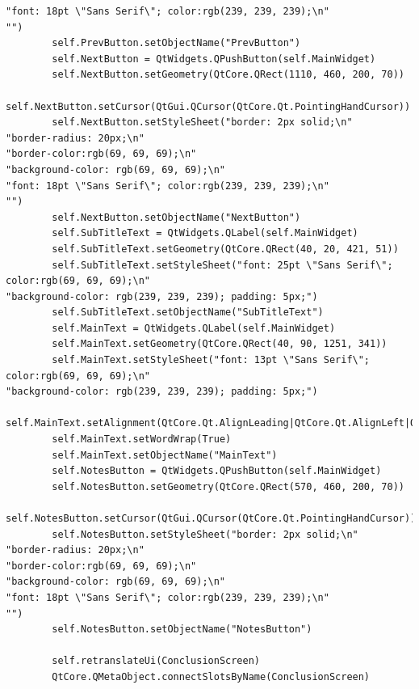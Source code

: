 \documentclass[12pt]{article}
\begin{document}
\begin{lstlisting}
"font: 18pt \"Sans Serif\"; color:rgb(239, 239, 239);\n"
"")
        self.PrevButton.setObjectName("PrevButton")
        self.NextButton = QtWidgets.QPushButton(self.MainWidget)
        self.NextButton.setGeometry(QtCore.QRect(1110, 460, 200, 70))
        self.NextButton.setCursor(QtGui.QCursor(QtCore.Qt.PointingHandCursor))
        self.NextButton.setStyleSheet("border: 2px solid;\n"
"border-radius: 20px;\n"
"border-color:rgb(69, 69, 69);\n"
"background-color: rgb(69, 69, 69);\n"
"font: 18pt \"Sans Serif\"; color:rgb(239, 239, 239);\n"
"")
        self.NextButton.setObjectName("NextButton")
        self.SubTitleText = QtWidgets.QLabel(self.MainWidget)
        self.SubTitleText.setGeometry(QtCore.QRect(40, 20, 421, 51))
        self.SubTitleText.setStyleSheet("font: 25pt \"Sans Serif\"; color:rgb(69, 69, 69);\n"
"background-color: rgb(239, 239, 239); padding: 5px;")
        self.SubTitleText.setObjectName("SubTitleText")
        self.MainText = QtWidgets.QLabel(self.MainWidget)
        self.MainText.setGeometry(QtCore.QRect(40, 90, 1251, 341))
        self.MainText.setStyleSheet("font: 13pt \"Sans Serif\"; color:rgb(69, 69, 69);\n"
"background-color: rgb(239, 239, 239); padding: 5px;")
        self.MainText.setAlignment(QtCore.Qt.AlignLeading|QtCore.Qt.AlignLeft|QtCore.Qt.AlignTop)
        self.MainText.setWordWrap(True)
        self.MainText.setObjectName("MainText")
        self.NotesButton = QtWidgets.QPushButton(self.MainWidget)
        self.NotesButton.setGeometry(QtCore.QRect(570, 460, 200, 70))
        self.NotesButton.setCursor(QtGui.QCursor(QtCore.Qt.PointingHandCursor))
        self.NotesButton.setStyleSheet("border: 2px solid;\n"
"border-radius: 20px;\n"
"border-color:rgb(69, 69, 69);\n"
"background-color: rgb(69, 69, 69);\n"
"font: 18pt \"Sans Serif\"; color:rgb(239, 239, 239);\n"
"")
        self.NotesButton.setObjectName("NotesButton")

        self.retranslateUi(ConclusionScreen)
        QtCore.QMetaObject.connectSlotsByName(ConclusionScreen)


\end{lstlisting}
\end{document}
